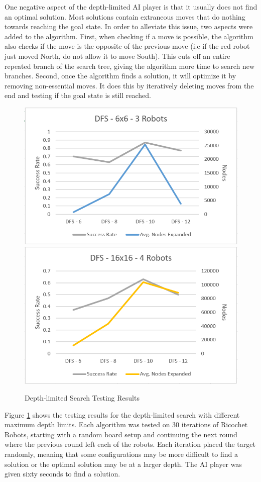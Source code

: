 \documentclass[a4paper,10pt]{article}
\begin{document}
  One negative aspect of the depth-limited AI player is that it usually does not find an optimal solution.  Most solutions contain extraneous moves that do nothing
  towards reaching the goal state.  In order to alleviate this issue, two aspects were added to the algorithm.  First, when checking if a move is possible, the
  algorithm also checks if the move is the opposite of the previous move (i.e if the red robot just moved North, do not allow it to move South).  This cuts off an
  entire repeated branch of the search tree, giving the algorithm more time to search new branches.  Second, once the algorithm finds a solution, it will optimize it
  by removing non-essential moves.  It does this by iteratively deleting moves from the end and testing if the goal state is still reached. \\

  \begin{figure}[h!]
    \centering
   \includegraphics[width=0.45\linewidth]{figures/img1.PNG}
    \includegraphics[width=0.45\linewidth]{figures/img2.PNG}
    \caption{Depth-limited Search Testing Results}
    \label{fig:DFS_chart}
  \end{figure}



  Figure \ref{fig:DFS_chart} shows the testing results for the depth-limited search with different maximum depth limits.  Each algorithm was tested on 30 iterations
  of Ricochet Robots, starting with a random board setup and continuing the next round where the previous round left each of the robots.  Each iteration placed the
  target randomly, meaning that some configurations may be more difficult to find a solution or the optimal solution may be at a larger depth.  The AI player was
  given sixty seconds to find a solution. \\
\end{document}
